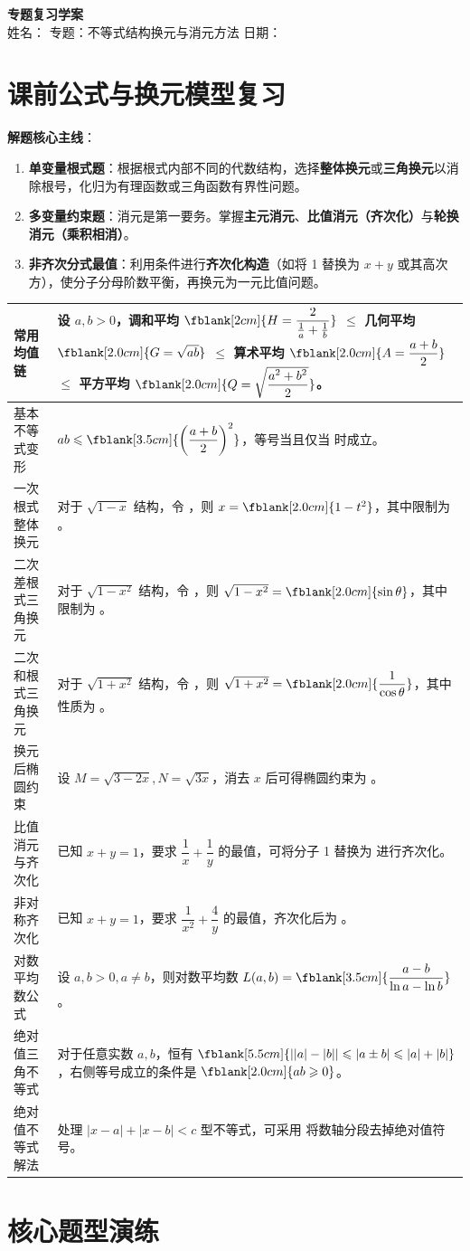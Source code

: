 \documentclass[12pt,a4paper]{ctexart}
\newcommand{\formulatable}{%
  \arrayrulecolor{rulecolor}%
  \begin{tabularx}{\textwidth}{p{4.2cm}X}
  \toprule[1.2pt]
  常用均值链 & 设 \(a,b > 0\)，调和平均 \(\fblank[2cm]{H = \dfrac{2}{\frac{1}{a}+\frac{1}{b}}}\) \(\leqslant\) 几何平均 \(\fblank[2.0cm]{G = \sqrt{ab}}\) \(\leqslant\) 算术平均 \(\fblank[2.0cm]{A = \dfrac{a+b}{2}}\) \(\leqslant\) 平方平均 \(\fblank[2.0cm]{Q = \sqrt{\dfrac{a^2+b^2}{2}}}\)。\\ \hline
  基本不等式变形 & \(ab \leqslant \fblank[3.5cm]{\left(\dfrac{a+b}{2}\right)^2}\)，等号当且仅当 \fblank[1.5cm]{\(a=b\)} 时成立。\\ \hline
  一次根式整体换元 & 对于 \(\sqrt{1-x}\) 结构，令 \fblank[2.5cm]{\(t = \sqrt{1-x}\)}，则 \(x = \fblank[2.0cm]{1-t^2}\)，其中限制为 \fblank[1.5cm]{\(t \geqslant 0\)}。\\ \hline
  二次差根式三角换元 & 对于 \(\sqrt{1-x^2}\) 结构，令 \fblank[2.5cm]{\(x = \cos\theta\)}，则 \(\sqrt{1-x^2} = \fblank[2.0cm]{\sin\theta}\)，其中限制为 \fblank[2.0cm]{\(\theta \in [0, \pi]\)}。\\ \hline
  二次和根式三角换元 & 对于 \(\sqrt{1+x^2}\) 结构，令 \fblank[2.5cm]{\(x = \tan\theta\)}，则 \(\sqrt{1+x^2} = \fblank[2.0cm]{\dfrac{1}{\cos\theta}}\)，其中性质为 \fblank[3.5cm]{\(1+\tan^2\theta = \dfrac{1}{\cos^2\theta}\)}。\\ \hline
  换元后椭圆约束 & 设 \(M = \sqrt{3-2x}, N = \sqrt{3x}\)，消去 \(x\) 后可得椭圆约束为 \fblank[4.0cm]{\(\dfrac{M^2}{3} + \dfrac{2N^2}{9} = 1\)}。\\ \hline
  比值消元与齐次化 & 已知 \(x+y=1\)，要求 \(\dfrac{1}{x} + \dfrac{1}{y}\) 的最值，可将分子 1 替换为 \fblank[2.5cm]{\(x+y\)} 进行齐次化。\\ \hline
  非对称齐次化 & 已知 \(x+y=1\)，要求 \(\dfrac{1}{x^2} + \dfrac{4}{y}\) 的最值，齐次化后为 \fblank[5.0cm]{\(\dfrac{(x+y)^2}{x^2} + \dfrac{4(x+y)}{y}\)}。\\ \hline
  对数平均数公式 & 设 \(a,b > 0, a \neq b\)，则对数平均数 \(L(a,b) = \fblank[3.5cm]{\dfrac{a-b}{\ln a - \ln b}}\)。\\ \hline
  绝对值三角不等式 & 对于任意实数 \(a,b\)，恒有 \(\fblank[5.5cm]{\left| |a| - |b| \right| \leqslant |a \pm b| \leqslant |a| + |b|}\)，右侧等号成立的条件是 \(\fblank[2.0cm]{ab \geqslant 0}\)。\\ \hline
  绝对值不等式解法 & 处理 \(|x-a| + |x-b| < c\) 型不等式，可采用 \fblank[4.0cm]{零点分段讨论法} 将数轴分段去掉绝对值符号。\\
  \bottomrule[1.2pt]
  \end{tabularx}%
}
\begin{document}
\begin{center}
  {\Large\bfseries 专题复习学案}\\
  \vspace{0.6em}
  姓名：\blank{3cm}
  \quad
  专题：不等式结构换元与消元方法
  \quad
  日期：\blank{3cm}
\end{center}

\section{课前公式与换元模型复习}

\begin{tcolorbox}[
  enhanced,
  colback=white,
  colframe=black,
  boxrule=0.8pt,
  arc=0pt,
  left=10pt, right=10pt, top=8pt, bottom=8pt,
  title={\bfseries 【不等式解题核心扫描】}
]
  \textbf{解题核心主线}：
  \begin{enumerate}[label=\arabic*. , leftmargin=2em, nosep]
    \item \textbf{单变量根式题}：根据根式内部不同的代数结构，选择\textbf{整体换元}或\textbf{三角换元}以消除根号，化归为有理函数或三角函数有界性问题。
    \item \textbf{多变量约束题}：消元是第一要务。掌握\textbf{主元消元}、\textbf{比值消元（齐次化）}与\textbf{轮换消元（乘积相消）}。
    \item \textbf{非齐次分式最值}：利用条件进行\textbf{齐次化构造}（如将 1 替换为 $x+y$ 或其高次方），使分子分母阶数平衡，再换元为一元比值问题。
  \end{enumerate}
\end{tcolorbox}

\vspace{0.8em}
\begingroup
\large
\renewcommand{\arraystretch}{1.5}
\linespread{1.3}\selectfont
\showprompttrue 
\formulatable
\endgroup

\newpage

\section{核心题型演练}

\autoquestion{\qOneStem}
\qOneOptions
\choiceworkarea[3.5cm]

\autoquestion{\qTwoStem}
\qTwoOptions
\choiceworkarea[3.8cm]
\end{document}

